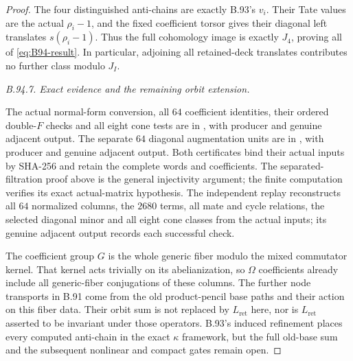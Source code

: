 \begin{proof}
The four distinguished anti-chains are exactly B.93's $v_i$.
Their Tate values are the actual $\rho_i-1$, and the fixed
coefficient torsor gives their diagonal left translates
$s(\rho_i-1)$. Thus the full cohomology image is exactly
$J_4$, proving all of \eqref{eq:B94-result}. In particular,
adjoining all retained-deck translates contributes no further
class modulo $J_I$.

\emph{B.94.7. Exact evidence and the remaining orbit extension.}
\begingroup\raggedright
The actual normal-form conversion, all $64$ coefficient
identities, their ordered double-$F$ checks and all eight
cone tests are in
,
with producer
and genuine adjacent output. The separate $64$ diagonal
augmentation units are in
,
with producer
and genuine adjacent output. Both certificates bind their
actual inputs by SHA-256 and retain the complete words and
coefficients. The separated-filtration proof above is the
general injectivity argument; the finite computation verifies
its exact actual-matrix hypothesis.
The independent replay
reconstructs all $64$ normalized columns, the $2680$ terms,
all mate and cycle relations, the selected diagonal minor
and all eight cone classes from the actual inputs; its
genuine adjacent output records each successful check.\par
\endgroup

The coefficient group $G$ is the whole generic fiber modulo
the mixed commutator kernel. That kernel acts trivially on
its abelianization, so $\Omega$ coefficients already include
all generic-fiber conjugations of these columns. The further
node transports in B.91 come from the old product-pencil
base paths and their action on this fiber data. Their orbit
sum is not replaced by $L_{\mathrm{ret}}$ here, nor is
$L_{\mathrm{ret}}$ asserted to be invariant under those
operators. B.93's induced refinement places every computed
anti-chain in the exact $\kappa$ framework, but the full
old-base sum and the subsequent nonlinear and compact gates
remain open.
\end{proof}
